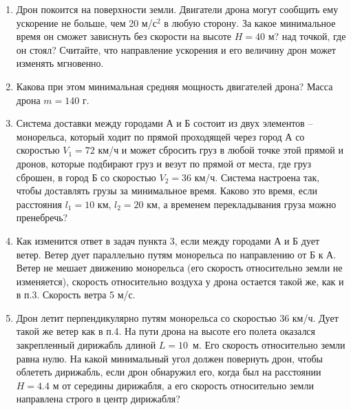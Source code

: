 
\begin{enumerate}
    \item Дрон покоится на поверхности земли. Двигатели дрона могут сообщить ему ускорение не больше, чем 20 м/с$^2$ в любую сторону. За какое минимальное время он сможет зависнуть без скорости на высоте $H = 40$ м? над точкой, где он стоял? Считайте, что направление ускорения и его величину дрон может изменять мгновенно.
    

    \item Какова при этом минимальная средняя мощность двигателей дрона? Масса дрона $m = 140$ г.
    \item Система доставки между городами А и Б состоит из двух элементов – монорельса, который ходит по прямой проходящей через город А со скоростью $V_1 = 72$ км/ч и может сбросить груз в любой точке этой прямой и дронов, которые подбирают груз и везут по прямой от места, где груз сброшен, в город Б со скоростью $V_2 = 36$ км/ч. Система настроена так, чтобы доставлять грузы за минимальное время. Каково это время, если расстояния $l_1 = 10$ км, $l_2 = 20$ км, а временем перекладывания груза можно пренебречь?
    \item Как изменится ответ в задач пункта 3, если между городами А и Б дует ветер. Ветер дует параллельно путям монорельса по направлению от Б к А. Ветер не мешает движению монорельса (его скорость относительно земли не изменяется), скорость относительно воздуха у дрона остается такой же, как и в п.3.  Скорость ветра 5 м/с.
    \item Дрон летит перпендикулярно путям монорельса со скоростью 36 км/ч. Дует такой же ветер как в п.4.  На пути дрона на высоте его полета оказался закрепленный дирижабль длиной \linebreak $L = 10$~м. Его скорость относительно земли равна нулю. На какой минимальный угол должен повернуть дрон, чтобы облететь дирижабль, если дрон обнаружил его, когда был на расстоянии \linebreak $H = 4.4$ м от середины дирижабля, а его скорость относительно земли направлена строго в центр дирижабля?
\end{enumerate}